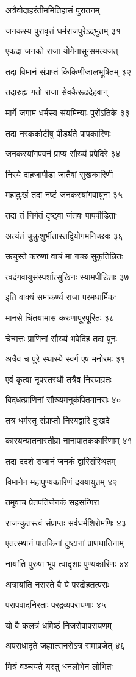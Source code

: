 अत्रैवोदाहरंतीममितिहासं पुरातनम्

जनकस्य पुरावृत्तं धर्मराजपुरेऽद्भुतम् ३१

एकदा जनको राजा योगेनासून्समत्यजत्

तदा विमानं संप्राप्तं किंकिणीजालभूषितम् ३२

तदारुह्य गतो राजा सेवकैरूढदेहवान्

मार्गे जगाम धर्मस्य संयमिन्याः पुरोंऽतिके ३३

तदा नरककोटीषु पीड्यंते पापकारिणः

जनकस्यांगपवनं प्राप्य सौख्यं प्रपेदिरे ३४

निरये दाहजापीडा जातैषां सुखकारिणी

महादुःखं तदा नष्टं जनकस्यांगवायुना ३५

तदा तं निर्गतं दृष्ट्वा जंतवः पापपीडिताः

अत्यंतं चुक्रुशुर्भीतास्तद्वियोगमनिच्छवः ३६

ऊचुस्ते करुणां वाचं मा गच्छ सुकृतिन्नितः

त्वदंगवायुसंस्पर्शात्सुखिनः स्यामपीडिताः ३७

इति वाक्यं समाकर्ण्य राजा परमधार्मिकः

मानसे चिंतयामास करुणापूरपूरितः ३८

चेन्मत्तः प्राणिनां सौख्यं भवेदिह तदा पुनः

अत्रैव च पुरे स्थास्ये स्वर्ग एष मनोरमः ३९

एवं कृत्वा नृपस्तस्थौ तत्रैव निरयाग्रतः

विदधत्प्राणिनां सौख्यमनुकंपितमानसः ४०

तत्र धर्मस्तु संप्राप्तो निरयद्वारि दुःखदे

कारयन्यातनास्तीव्रा नानापातककारिणाम् ४१

तदा ददर्श राजानं जनकं द्वारिसंस्थितम्

विमानेन महापुण्यकारिणं दययायुतम् ४२

तमुवाच प्रेतपतिर्जनकं सहसन्गिरा

राजन्कुतस्त्वं संप्राप्तः सर्वधर्मशिरोमणिः ४३

एतत्स्थानं पातकिनां दुष्टानां प्राणघातिनाम्

नायांति पुरुषा भूप त्वादृशाः पुण्यकारिणः ४४

अत्रायांति नरास्ते वै ये परद्रोहतत्पराः

परापवादनिरताः परद्रव्यपरायणाः ४५

यो वै कलत्रं धर्मिष्ठं निजसेवापरायणम्

अपराधादृते जह्यात्सनरोऽत्र समाव्रजेत् ४६

मित्रं वञ्चयते यस्तु धनलोभेन लोभितः

